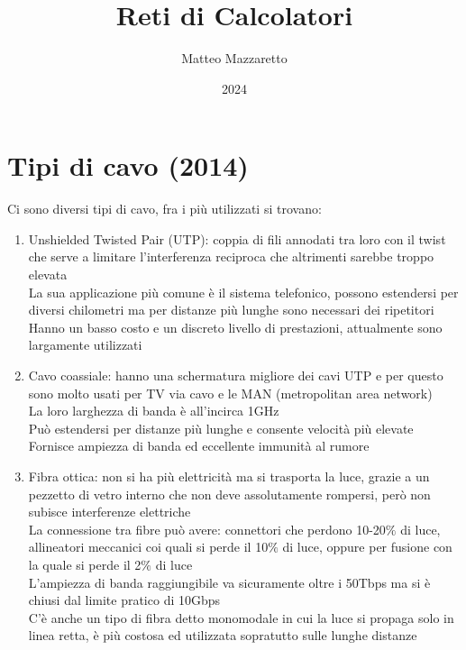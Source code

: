\documentclass[10pt,oneside,a4paper]{article}
\title{Reti di Calcolatori}
\author{Matteo Mazzaretto}
\date{2024}
\begin{document}
\maketitle
\begin{center}
\renewcommand{\contentsname}{Indice}
\tableofcontents
\end{center}
\setcounter{page}{1}
\newpage
\section{Tipi di cavo (2014)}
Ci sono diversi tipi di cavo, fra i più utilizzati si trovano:\\
\begin{enumerate}
\item Unshielded Twisted Pair (UTP): coppia di fili annodati tra loro con il twist che serve a limitare l'interferenza reciproca che altrimenti sarebbe troppo elevata\\
La sua applicazione più comune è il sistema telefonico, possono estendersi per diversi chilometri ma per distanze più lunghe sono necessari dei ripetitori\\
Hanno un basso costo e un discreto livello di prestazioni, attualmente sono largamente utilizzati
\item Cavo coassiale: hanno una schermatura migliore dei cavi UTP e per questo sono molto usati per TV via cavo e le MAN (metropolitan area network)\\
La loro larghezza di banda è all'incirca 1GHz\\
Può estendersi per distanze più lunghe e consente velocità più elevate\\
Fornisce ampiezza di banda ed eccellente immunità al rumore
\item Fibra ottica: non si ha più elettricità ma si trasporta la luce, grazie a un pezzetto di vetro interno che non deve assolutamente rompersi, però non subisce interferenze elettriche\\
La connessione tra fibre può avere: connettori che perdono 10-20$\%$ di luce, allineatori meccanici coi quali si perde il 10$\%$ di luce, oppure per fusione con la quale si perde il 2$\%$ di luce\\
L'ampiezza di banda raggiungibile va sicuramente oltre i 50Tbps ma si è chiusi dal limite pratico di 10Gbps\\
C'è anche un tipo di fibra detto monomodale in cui la luce si propaga solo in linea retta, è più costosa ed utilizzata sopratutto sulle lunghe distanze
\end{enumerate}
\end{document}
